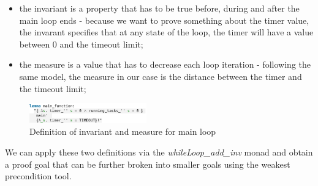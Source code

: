 \documentclass[conference]{IEEEtran}
\begin{document}
\begin{itemize}
\item the invariant is a property that has to be true before, during and after the main loop ends - because we want to prove something about the timer value, the invarant specifies that at any state of the loop, the timer will have a value between 0 and the timeout limit;
\item the measure is a value that has to decrease each loop iteration - following the same model, the measure in our case is the distance between the timer and the timeout limit;
\end{itemize}
\begin{figure}[htbp]
\centerline{\includegraphics[width=0.45\textwidth]{main_lemma.png}}
\caption{Definition of invariant and measure for main loop} 
\label{fig}
\end{figure}
We can apply these two definitions via the \textit{whileLoop\_add\_inv} monad and obtain a proof goal that can be further broken into smaller goals using the weakest precondition tool.
\end{document}
